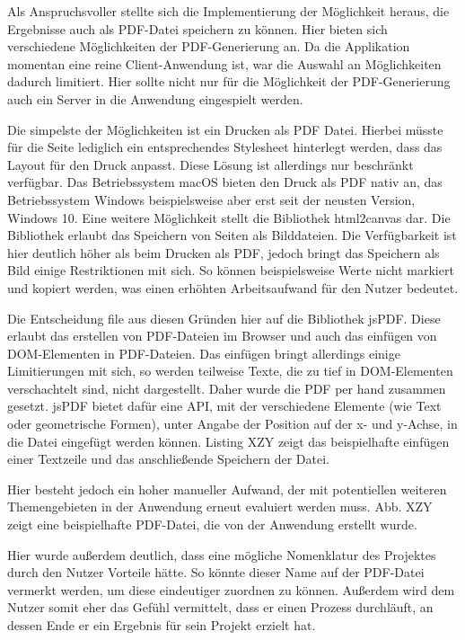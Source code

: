 Als Anspruchsvoller stellte sich die Implementierung der Möglichkeit heraus, die Ergebnisse auch als PDF-Datei speichern zu können. Hier bieten sich verschiedene Möglichkeiten der PDF-Generierung an. Da die Applikation momentan eine reine Client-Anwendung ist, war die Auswahl an Möglichkeiten dadurch limitiert. Hier sollte nicht nur für die Möglichkeit der PDF-Generierung auch ein Server in die Anwendung eingespielt werden.

Die simpelste der Möglichkeiten ist ein Drucken als PDF Datei. Hierbei müsste für die Seite lediglich ein entsprechendes Stylesheet hinterlegt werden, dass das Layout für den Druck anpasst. Diese Lösung ist allerdings nur beschränkt verfügbar. Das Betriebssystem macOS bieten den Druck als PDF nativ an, das Betriebssystem Windows beispielsweise aber erst seit der neusten Version, Windows 10.
Eine weitere Möglichkeit stellt die Bibliothek html2canvas\footnotemark{} dar. Die Bibliothek erlaubt das Speichern von Seiten als Bilddateien. Die Verfügbarkeit ist hier deutlich höher als beim Drucken als PDF, jedoch bringt das Speichern als Bild einige Restriktionen mit sich. So können beispielsweise Werte nicht markiert und kopiert werden, was einen erhöhten Arbeitsaufwand für den Nutzer bedeutet.


Die Entscheidung file aus diesen Gründen hier auf die Bibliothek jsPDF\footnotemark{}. Diese erlaubt das erstellen von PDF-Dateien im Browser und auch das einfügen von DOM-Elementen in PDF-Dateien. Das einfügen bringt allerdings einige Limitierungen mit sich, so werden teilweise Texte, die zu tief in DOM-Elementen verschachtelt sind, nicht dargestellt. Daher wurde die PDF per hand zusammen gesetzt. jsPDF bietet dafür eine API, mit der verschiedene Elemente (wie Text oder geometrische Formen), unter Angabe der Position auf der x- und y-Achse, in die Datei eingefügt werden können. Listing XZY zeigt das beispielhafte einfügen einer Textzeile und das anschließende Speichern der Datei.


Hier besteht jedoch ein hoher manueller Aufwand, der mit potentiellen weiteren Themengebieten in der Anwendung erneut evaluiert werden muss. Abb. XZY zeigt eine beispielhafte PDF-Datei, die von der Anwendung erstellt wurde.

Hier wurde außerdem deutlich, dass eine mögliche Nomenklatur des Projektes durch den Nutzer Vorteile hätte. So könnte dieser Name auf der PDF-Datei vermerkt werden, um diese eindeutiger zuordnen zu können. Außerdem wird dem Nutzer somit eher das Gefühl vermittelt, dass er einen Prozess durchläuft, an dessen Ende er ein Ergebnis für sein Projekt erzielt hat.

